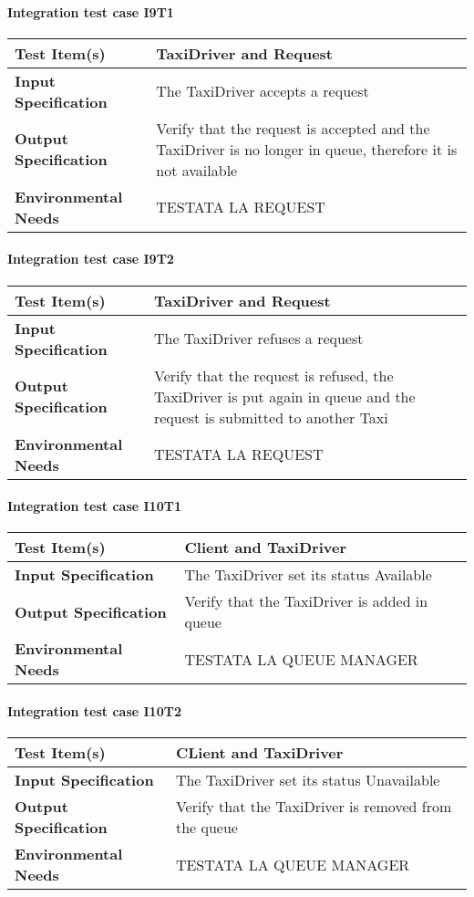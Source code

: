 \paragraph{Integration test case I9T1}
\begin{tabular}{l | l}
	\hline
	\textbf{Test Item(s)} & TaxiDriver and Request \\
	\hline
	\textbf{Input Specification} &  The TaxiDriver accepts a request\\
	\hline
	\textbf{Output Specification} & Verify that the request is accepted and the TaxiDriver is no longer in queue, therefore it is not available\\
	\hline
	\textbf{Environmental Needs} & TESTATA LA REQUEST \\
\end{tabular}

\paragraph{Integration test case I9T2}
\begin{tabular}{l | l}
	\hline
	\textbf{Test Item(s)} & TaxiDriver and Request \\
	\hline
	\textbf{Input Specification} & The TaxiDriver refuses a request\\
	\hline
	\textbf{Output Specification} & Verify that the request is refused, the TaxiDriver is put again in queue and the request is submitted to another Taxi \\
	\hline
	\textbf{Environmental Needs} & TESTATA LA REQUEST \\
\end{tabular}

\paragraph{Integration test case I10T1}
\begin{tabular}{l | l}
	\hline
	\textbf{Test Item(s)} & Client and TaxiDriver\\
	\hline
	\textbf{Input Specification} & The TaxiDriver set its status Available\\
	\hline
	\textbf{Output Specification} & Verify that the TaxiDriver is added in queue \\
	\hline
	\textbf{Environmental Needs} & TESTATA LA QUEUE MANAGER \\
\end{tabular}

\paragraph{Integration test case I10T2}
\begin{tabular}{l | l}
	\hline
	\textbf{Test Item(s)} & CLient and TaxiDriver \\
	\hline
	\textbf{Input Specification} & The TaxiDriver set its status Unavailable\\
	\hline
	\textbf{Output Specification} & Verify that the TaxiDriver is removed from the queue \\
	\hline
	\textbf{Environmental Needs} & TESTATA LA QUEUE MANAGER \\
\end{tabular}

